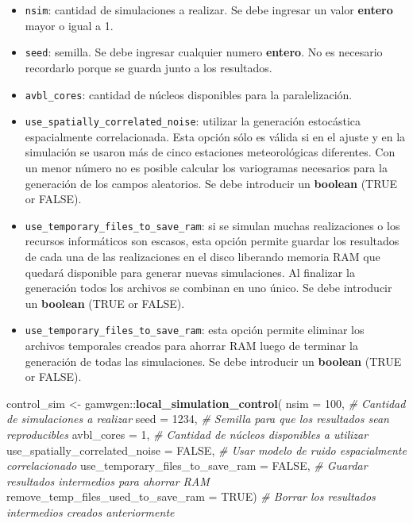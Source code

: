 \documentclass[
]{article}
\newenvironment{Shaded}{}{}
\newcommand{\CommentTok}[1]{\textcolor[rgb]{0.38,0.63,0.69}{\textit{#1}}}
\newcommand{\DataTypeTok}[1]{\textcolor[rgb]{0.56,0.13,0.00}{#1}}
\newcommand{\DecValTok}[1]{\textcolor[rgb]{0.25,0.63,0.44}{#1}}
\newcommand{\KeywordTok}[1]{\textcolor[rgb]{0.00,0.44,0.13}{\textbf{#1}}}
\newcommand{\NormalTok}[1]{#1}
\newcommand{\OperatorTok}[1]{\textcolor[rgb]{0.40,0.40,0.40}{#1}}
\newcommand{\OtherTok}[1]{\textcolor[rgb]{0.00,0.44,0.13}{#1}}
\newcommand{\StringTok}[1]{\textcolor[rgb]{0.25,0.44,0.63}{#1}}
\providecommand{\tightlist}{%
  \setlength{\itemsep}{0pt}\setlength{\parskip}{0pt}}
\begin{document}
\begin{itemize}
\tightlist
\item
  \texttt{nsim}: cantidad de simulaciones a realizar. Se debe ingresar un valor \textbf{entero} mayor o igual a 1.
\item
  \texttt{seed}: semilla. Se debe ingresar cualquier numero \textbf{entero}. No es necesario recordarlo porque se guarda junto a los resultados.
\item
  \texttt{avbl\_cores}: cantidad de núcleos disponibles para la paralelización.
\item
  \texttt{use\_spatially\_correlated\_noise}: utilizar la generación estocástica espacialmente correlacionada. Esta opción sólo es válida si en el ajuste y en la simulación se usaron más de cinco estaciones meteorológicas diferentes. Con un menor número no es posible calcular los variogramas necesarios para la generación de los campos aleatorios. Se debe introducir un \textbf{boolean} (TRUE or FALSE).
\item
  \texttt{use\_temporary\_files\_to\_save\_ram}: si se simulan muchas realizaciones o los recursos informáticos son escasos, esta opción permite guardar los resultados de cada una de las realizaciones en el disco liberando memoria RAM que quedará disponible para generar nuevas simulaciones. Al finalizar la generación todos los archivos se combinan en uno único. Se debe introducir un \textbf{boolean} (TRUE or FALSE).
\item
  \texttt{use\_temporary\_files\_to\_save\_ram}: esta opción permite eliminar los archivos temporales creados para ahorrar RAM luego de terminar la generación de todas las simulaciones. Se debe introducir un \textbf{boolean} (TRUE or FALSE).
\end{itemize}

\begin{Shaded}
\begin{Highlighting}[]
\NormalTok{control_sim <-}\StringTok{ }\NormalTok{gamwgen}\OperatorTok{::}\KeywordTok{local_simulation_control}\NormalTok{(}
  \DataTypeTok{nsim =} \DecValTok{100}\NormalTok{, }\CommentTok{# Cantidad de simulaciones a realizar}
  \DataTypeTok{seed =} \DecValTok{1234}\NormalTok{, }\CommentTok{# Semilla para que los resultados sean reproducibles}
  \DataTypeTok{avbl_cores =} \DecValTok{1}\NormalTok{, }\CommentTok{# Cantidad de núcleos disponibles a utilizar}
  \DataTypeTok{use_spatially_correlated_noise =} \OtherTok{FALSE}\NormalTok{, }\CommentTok{# Usar modelo de ruido espacialmente correlacionado}
  \DataTypeTok{use_temporary_files_to_save_ram =} \OtherTok{FALSE}\NormalTok{, }\CommentTok{# Guardar resultados intermedios para ahorrar RAM}
  \DataTypeTok{remove_temp_files_used_to_save_ram =} \OtherTok{TRUE}\NormalTok{) }\CommentTok{# Borrar los resultados intermedios creados anteriormente}
\end{Highlighting}
\end{Shaded}
\end{document}
